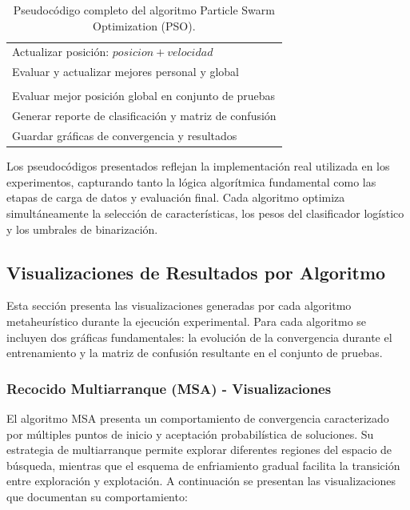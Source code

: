 \begin{table}[htbp]
{\begin{tabular}{|l|l|}
\multicolumn{2}{|l|}{\quad \quad Actualizar posición: $posicion + velocidad$} \\
\multicolumn{2}{|l|}{\quad \quad Evaluar y actualizar mejores personal y global} \\
\hline
\rowcolor{LightGray!10}
\multicolumn{2}{|l|}{\textbf{3. Evaluación final:}} \\
\hline
\multicolumn{2}{|l|}{Evaluar mejor posición global en conjunto de pruebas} \\
\multicolumn{2}{|l|}{Generar reporte de clasificación y matriz de confusión} \\
\multicolumn{2}{|l|}{Guardar gráficas de convergencia y resultados} \\
\hline
\end{tabular}
}
\caption{Pseudocódigo completo del algoritmo Particle Swarm Optimization (PSO).}
\label{tab:pseudocodigo_pso}
\end{table}

Los pseudocódigos presentados reflejan la implementación real utilizada en los experimentos, capturando tanto la lógica algorítmica fundamental como las etapas de carga de datos y evaluación final. Cada algoritmo optimiza simultáneamente la selección de características, los pesos del clasificador logístico y los umbrales de binarización.

\subsection{Visualizaciones de Resultados por Algoritmo}
\label{subsec:visualizaciones_algoritmos}

Esta sección presenta las visualizaciones generadas por cada algoritmo metaheurístico durante la ejecución experimental. Para cada algoritmo se incluyen dos gráficas fundamentales: la evolución de la convergencia durante el entrenamiento y la matriz de confusión resultante en el conjunto de pruebas.

\subsubsection{Recocido Multiarranque (MSA) - Visualizaciones}

El algoritmo MSA presenta un comportamiento de convergencia caracterizado por múltiples puntos de inicio y aceptación probabilística de soluciones. Su estrategia de multiarranque permite explorar diferentes regiones del espacio de búsqueda, mientras que el esquema de enfriamiento gradual facilita la transición entre exploración y explotación. A continuación se presentan las visualizaciones que documentan su comportamiento:

